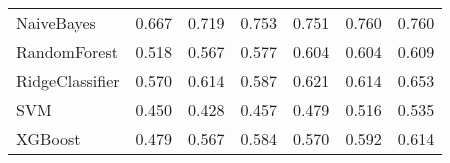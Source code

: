 \begin{tabular}{lllllll}
                     NaiveBayes & 0.667 &                     0.719 &                 0.753 &                  0.751 &                                   0.760 &    0.760 \\
                   RandomForest & 0.518 &                     0.567 &                 0.577 &                  0.604 &                                   0.604 &    0.609 \\
                RidgeClassifier & 0.570 &                     0.614 &                 0.587 &                  0.621 &                                   0.614 &    0.653 \\
                            SVM & 0.450 &                     0.428 &                 0.457 &                  0.479 &                                   0.516 &    0.535 \\
                        XGBoost & 0.479 &                     0.567 &                 0.584 &                  0.570 &                                   0.592 &    0.614 \\
\bottomrule
\end{tabular}
